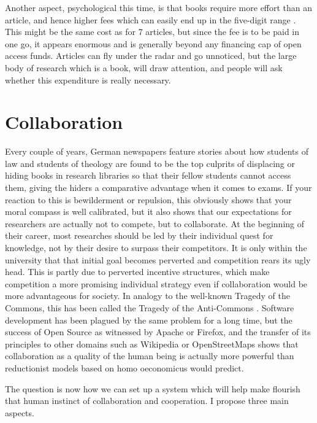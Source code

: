 \documentclass[12pt]{article}
\begin{document}
 Another aspect, psychological this time, is that books require more effort than an article, and hence higher fees which can easily end up in the five-digit range \citep{abc}. This might be the same cost as for 7 articles, but since the fee is to be paid in one go, it appears enormous and is generally beyond any financing cap of open access funds. Articles can fly under the radar and go unnoticed, but the large body of research which is a book, will draw attention, and people will ask whether this expenditure is really necessary. 
 
\section{Collaboration}
Every couple of years, German newspapers feature stories about how students of law and students of theology are found to be the top culprits of displacing or hiding books in research libraries so that their fellow students cannot access them, giving the hiders a comparative advantage when it comes to exams. If your reaction to this is bewilderment or repulsion, this obviously shows that your moral compass is well calibrated, but it also shows that our expectations for researchers are actually not to compete, but to collaborate. At the beginning of their career, most researches should be led by their individual quest for knowledge, not by their desire to surpass their competitors. It is only within the university that that initial goal becomes perverted and competition rears its ugly head. This is partly due to perverted incentive structures, which make competition a more promising individual strategy even if collaboration would be more advantageous for society. In analogy to the well-known Tragedy of the Commons, this has been called the Tragedy of the Anti-Commons \citep{Heller1998}. Software development has been plagued by the same problem for a long time,  but the success of Open Source as witnessed by Apache or Firefox, and the transfer of its principles to other domains such as Wikipedia or OpenStreetMaps shows that collaboration as a quality of the human being is actually more powerful than reductionist models based on homo oeconomicus would predict.

The question is now how we can set up a system which will help make flourish that human instinct of collaboration and cooperation. 
I propose three main aspects.
\end{document}
